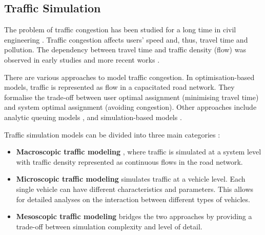 \subsection{Traffic Simulation}


The problem of traffic congestion has been studied for a long time in civil engineering \cite{wardrop1952road, lighthill1955kinematic}. Traffic congestion affects users' speed and, thus, travel time and pollution. The dependency between travel time and traffic density (flow) was observed in early studies \cite{greenshields1935study} and more recent works \cite{siebel2006fundamental, wilkie2011self}.

There are various approaches to model traffic congestion. In optimisation-based models, \cite{peeta1995system} traffic is represented as flow in a capacitated road network. They formalise the trade-off between user optimal assignment (minimising travel time) and system optimal assignment (avoiding congestion). Other approaches include analytic queuing models \cite{osorio2009analytic},  and simulation-based models \cite{treiber2000microscopic, krajzewicz2002sumo, balmer2009matsim}.

Traffic simulation models can be divided into three main categories \cite{barcelo2010fundamentals}:

\begin{itemize}
    \item \textbf{Macroscopic traffic modeling} \cite{payne1979freflo}, where traffic is simulated at a system level with traffic density represented as continuous flows in the road network.
    \item \textbf{Microscopic traffic modeling} \cite{barcelo2005microscopic} simulates traffic at a vehicle level. Each single vehicle can have different characteristics and parameters. This allows for detailed analyses on the interaction between different types of vehicles.
    \item \textbf{Mesoscopic traffic modeling} \cite{burghout2006discrete} bridges the two approaches by providing a trade-off between simulation complexity and level of detail.
\end{itemize}

